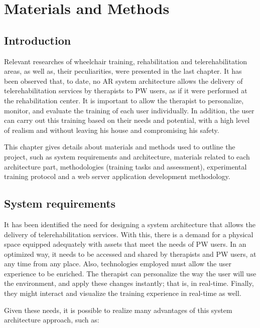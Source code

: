 \chapter{Materials and Methods}

\section{Introduction}

Relevant researches of wheelchair training, rehabilitation and telerehabilitation areas, as well as, their peculiarities, were presented in the last chapter. It has been observed that, to date, no AR system architecture allows the delivery of telerehabilitation services by therapists to PW users, as if it were performed at the rehabilitation center. It is important to allow the therapist to personalize, monitor, and evaluate the training of each user individually. In addition, the user can carry out this training based on their needs and potential, with a high level of realism and without leaving his house and compromising his safety. 

This chapter gives details about materials and methods used to outline the project, such as system requirements and architecture, materials related to each architecture part, methodologies (training tasks and assessment), experimental training protocol and a web server application development methodology.

\section{System requirements}
\label{systemrequir}

It has been identified the need for designing a system architecture that allows the delivery of telerehabilitation services. With this, there is a demand for a physical space equipped adequately with assets that meet the needs of PW users. In an optimized way,  it needs to be accessed and shared by therapists and PW users, at any time from any place. Also, technologies employed must allow the user experience to be enriched. The therapist can personalize the way the user will use the environment, and apply these changes instantly; that is, in real-time. Finally, they might interact and visualize the training experience in real-time as well.

Given these needs, it is possible to realize many advantages of this system architecture approach, such as:

